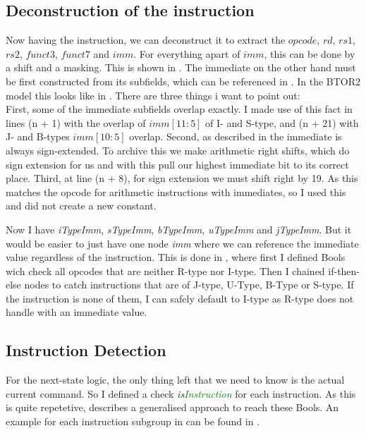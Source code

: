 \subsection{Deconstruction of the instruction}
Now having the instruction, we can deconstruct it to extract the $opcode$,
$rd$, $rs1$, $rs2$, $funct3$, $funct7$ and $imm$. For everything apart of
$imm$, this can be done by a shift and a masking. This is shown in
. The immediate on the other hand must be first
constructed from its subfields, which can be referenced in
. In the BTOR2 model this looks like in
. 
There are three things i want to point out:\\ First, some of the immediate
subfields overlap exactly. I made use of this fact in lines (n + 1) with the
overlap of $imm[11:5]$ of I- and S-type, and (n + 21) with J- and B-types
$imm[10:5]$ overlap. Second, as described in  the
immediate is always sign-extended. To archive this we make arithmetic right
shifts, which do sign extension for us and with this pull our highest immediate
bit to its correct place. Third, at line (n + 8), for sign extension we must
shift right by 19. As this matches the opcode for arithmetic instructions with
immediates, so I used this and did not create a new constant.

Now I have \textsl{iTypeImm}, \textsl{sTypeImm}, \textsl{bTypeImm},
\textsl{uTypeImm} and \textsl{jTypeImm}. But it would be easier to just have
one node \textsl{imm} where we can reference the immediate value regardless of
the instruction. This is done in , where first I defined
Bools wich check all opcodes that are neither R-type nor I-type. Then I chained
if-then-else nodes to catch instructions that are of J-type, U-Type, B-Type or
S-type. If the instruction is none of them, I can safely default to I-type as
R-type does not handle with an immediate value.





\subsection{Instruction Detection}

For the next-state logic, the only thing left that we need to know is the
actual current command. So I defined a check
\textsl{is\textcolor{Green}{Instruction}} for each instruction. As this is
quite repetetive,  describes a generalised
approach to reach these Bools. An example for each instruction subgroup in
 can be found in .

